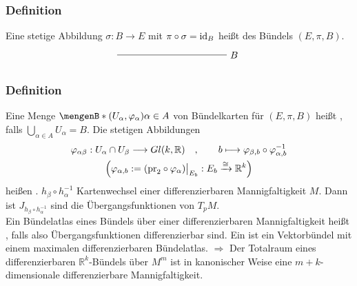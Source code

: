 \subsubsection{Definition} %
\label{ssub:437}
Eine stetige Abbildung $\sigma : B  \to E$ mit $\pi \circ \sigma = \id_B$ heißt  des Bündels $(E,\pi ,B)$.
\[
	\begin{tikzpicture}
		\draw (0,0) -- (4,0) node[right]{$B$};
	\end{tikzpicture}
\] 

\subsubsection[Definition: Bündelatlas]{Definition} %
\label{ssub:438}
Eine Menge $\set[(U_\alpha, \varphi_\alpha)]{\alpha \in A}$ von Bündelkarten für $(E,\pi ,B)$ heißt , falls $\bigcup_{\alpha \in A} U_\alpha = B$.
Die stetigen Abbildungen
\begin{gather}
	\varphi_{\alpha \beta} : U_\alpha \cap U_\beta \longrightarrow Gl(k,\mathds{R}) \quad, \qquad b \longmapsto \varphi_{\beta,b} \circ \varphi_{\alpha,b} ^{-1} \\
	 \enbrace*{ \varphi_{\alpha, b} := (\mathrm{pr}_2 \circ \varphi_\alpha)\big|_{E_b} : E_b \xrightarrow{\cong} \mathds{R}^k } 
\end{gather}
heißen .
$h_\beta \circ  h_\alpha ^{-1}$ Kartenwechsel einer differenzierbaren Mannigfaltigkeit $M$. Dann ist $J_{h_\beta \circ h_\alpha ^{-1}}$ sind die Übergangsfunktionen von
$T_p M$. \medskip\\
Ein Bündelatlas eines Bündels über einer differenzierbaren Mannigfaltigkeit heißt , falls also Übergangsfunktionen 
differenzierbar sind. Ein  ist ein Vektorbündel mit einem maximalen differenzierbaren Bündelatlas.
$\Rightarrow$ Der Totalraum eines differenzierbaren $\mathds{R}^k$-Bündels über $M^m$ ist in kanonischer Weise eine $m+k$-dimensionale differenzierbare Mannigfaltigkeit.

